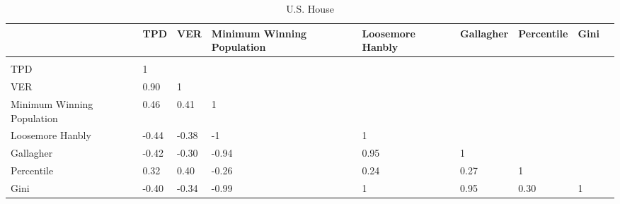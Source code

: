 
\begin{landscape}

\begin{table}[!htbp] \centering 
  \caption{U.S. House} 
  \label{tab:cor_house} 
\begin{tabular}{C{2.5cm}p{1.75cm}p{1.75cm}p{1.75cm}p{1.75cm}p{1.75cm}p{1.75cm}p{1.75cm}p{1.75cm}}
{} & {TPD} & {VER} & {Minimum Winning Population} & {Loosemore Hanbly} & {Gallagher} & {Percentile} & {Gini} \\ 
\hline \\[-1.8ex] 
{TPD} & 1 &  &  &  &  &  &  \\ 
{VER} & 0.90 & 1 &  &  &  &  &  \\ 
{Minimum Winning Population} & 0.46 & 0.41 & 1 &  &  &  &  \\ 
{Loosemore Hanbly} & -0.44 & -0.38 & -1 & 1 &  &  &  \\ 
{Gallagher} & -0.42 & -0.30 & -0.94 & 0.95 & 1 &  &  \\ 
{Percentile} & 0.32 & 0.40 & -0.26 & 0.24 & 0.27 & 1 &  \\ 
{Gini} & -0.40 & -0.34 & -0.99 & 1 & 0.95 & 0.30 & 1 \\ 
\end{tabular}
\tabnotes{}
\end{table}

\end{landscape}
 
